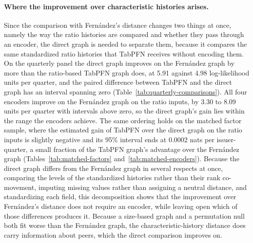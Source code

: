 \paragraph{Where the improvement over characteristic histories arises.}
Since the comparison with Fern\'andez's distance changes two things at
once, namely the way the ratio histories are compared and whether they pass
through an encoder, the direct graph is needed to separate them, because it
compares the same standardized ratio histories that TabPFN receives
without encoding them. On the quarterly panel the direct graph
improves on the Fern\'andez graph by
more than the ratio-based TabPFN graph does, at 5.91 against 4.98
log-likelihood units per quarter, and the paired difference between TabPFN
and the direct graph has an interval spanning zero
(Table~\ref{tab:quarterly-comparisons}). All four encoders improve on the
Fern\'andez graph on the ratio inputs, by 3.30 to 8.09 units per quarter
with intervals above zero, so the direct graph's gain lies within the range
the encoders achieve. The same ordering holds on the matched factor
sample, where the estimated gain of TabPFN over the direct
graph on the ratio inputs is slightly negative and its 95\% interval ends
at 0.0002 nats per issuer-quarter, a small fraction of the TabPFN graph's
advantage over the Fern\'andez graph (Tables~\ref{tab:matched-factors}
and~\ref{tab:matched-encoders}). Because the direct graph differs from the
Fern\'andez graph in several respects at once, comparing the levels of
the standardized histories rather than their rank co-movement, imputing
missing values rather than assigning a neutral distance, and standardizing
each field, this decomposition shows that the improvement over
Fern\'andez's distance does not require an encoder, while leaving open
which of those differences produces it. Because a size-based graph
and a permutation null both fit worse than the Fern\'andez graph, the
characteristic-history distance does carry information about peers, which
the direct comparison improves on.

